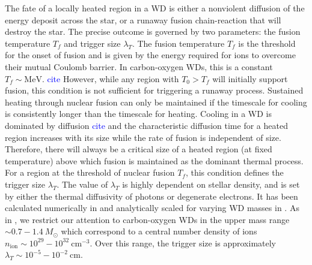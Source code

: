 \documentclass[twocolumn,showpacs,preprintnumbers,amsmath,amssymb,prd]{revtex4}
\newcommand{\MeV}{\text{MeV}}
\newcommand{\cm}{\text{cm}}
\begin{document}
The fate of a locally heated region in a WD is either a nonviolent diffusion of the energy deposit across the star, or a runaway fusion chain-reaction that will destroy the star.
The precise outcome is governed by two parameters: the fusion temperature $T_f$ and trigger size $\lambda_T$.
The fusion temperature $T_f$ is the threshold for the onset of fusion and is given by the energy required for ions to overcome their mutual Coulomb barrier.
In carbon-oxygen WDs, this is a constant $T_f \sim \MeV$. \textcolor{blue}{cite}
However, while any region with $T_0 > T_f$ will initially support fusion, this condition is not sufficient for triggering a runaway process.
Sustained heating through nuclear fusion can only be maintained if the timescale for cooling is consistently longer than the timescale for heating. 
Cooling in a WD is dominated by diffusion \textcolor{blue}{cite} and the characteristic diffusion time for a heated region increases with its size while the rate of fusion is independent of size. 
Therefore, there will always be a critical size of a heated region (at fixed temperature) above which fusion is maintained as the dominant thermal process.
For a region at the threshold of nuclear fusion $T_f$, this condition defines the trigger size $\lambda_T$.
The value of $\lambda_T$ is highly dependent on stellar density, and is set by either the thermal diffusivity of photons or degenerate electrons.
It has been calculated numerically in \cite{Woosley} and analytically scaled for varying WD masses in \cite{Graham:2015apa}.
As in \cite{Graham:2015apa}, we restrict our attention to carbon-oxygen WDs in the upper mass range $\sim 0.7 - 1.4 ~M_{\odot}$ which correspond to a central number density of ions $n_\text{ion} \sim 10^{29} - 10^{32} ~\cm^{-3}$.
Over this range, the trigger size is approximately $\lambda_T \sim 10^{-5} - 10^{-2} ~\text{cm}$.
\end{document}
